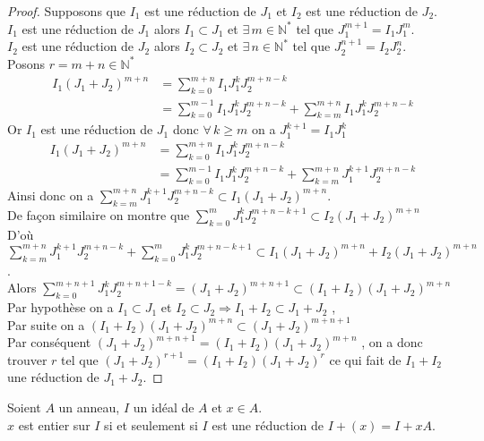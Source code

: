 \begin{proof}
	Supposons que $I_1$ est une réduction de $J_1$ et $I_2$ est une réduction de $J_2$.\\
	$I_1$ est une réduction de $J_1$ alors $I_1 \subset J_1$ et $\exists \, m \in \mathbb{N^*}$ tel que $J_1^{m+1} = I_1 J_1^m$.\\
	$I_2$ est une réduction de $J_2$ alors $I_2 \subset J_2$ et $\exists \, n \in \mathbb{N^*}$ tel que $J_2^{n+1} = I_2 J_2^n$.\\
	Posons $r=m+n \in \mathbb{N^*} $\\
	\begin{align*}
		I_1(J_1+J_2)^{m+n}& = \displaystyle \sum_{k=0}^{m+n}{I_1 J_1^k J_2^{m+n-k}}\\
		& = \displaystyle \sum_{k=0}^{m-1}{I_1 J_1^k J_2^{m+n-k}} + \displaystyle \sum_{k=m}^{m+n}{I_1 J_1^k J_2^{m+n-k}}
	\end{align*}
	Or $I_1$ est une réduction de $J_1$ donc $\forall \, k\geq m$ on a $J_1^{k+1} = I_1 J_1^{k}$
	\begin{align*}
		I_1(J_1+J_2)^{m+n}& = \displaystyle \sum_{k=0}^{m+n}{I_1 J_1^k J_2^{m+n-k}}\\
		& = \displaystyle \sum_{k=0}^{m-1}{I_1 J_1^k J_2^{m+n-k}} + \displaystyle \sum_{k=m}^{m+n}{J_1^{k+1} J_2^{m+n-k}}
	\end{align*}
	Ainsi donc on a $\displaystyle \sum_{k=m}^{m+n}{J_1^{k+1} J_2^{m+n-k}} \subset  I_1(J_1+J_2)^{m+n}$.\\
	De façon similaire on montre que $\displaystyle \sum_{k=0}^{m}{J_1^{k} J_2^{m+n-k+1}} \subset  I_2(J_1+J_2)^{m+n}$\\
	D'où $\displaystyle \sum_{k=m}^{m+n}{J_1^{k+1} J_2^{m+n-k}} + \displaystyle \sum_{k=0}^{m}{J_1^{k} J_2^{m+n-k+1}} \subset I_1(J_1+J_2)^{m+n} + I_2(J_1+J_2)^{m+n}$.\\ Alors $\displaystyle \sum_{k=0}^{m+n+1}{J_1^{k} J_2^{m+n+1-k}} = (J_1+J_2)^{m+n+1} \subset (I_1+I_2)(J_1+J_2)^{m+n}$\\
	Par hypothèse on a $I_1 \subset J_1$ et $I_2 \subset J_2 \Rightarrow I_1+I_2 \subset J_1+J_2$ ,\\
	Par suite on a $(I_1+I_2)(J_1+J_2)^{m+n} \subset (J_1+J_2)^{m+n+1}$\\ Par conséquent $(J_1+J_2)^{m+n+1} = (I_1+I_2)(J_1+J_2)^{m+n}$ , on a donc trouver $r$ tel que $(J_1+J_2)^{r+1} = (I_1+I_2)(J_1+J_2)^{r}$ ce qui fait de $I_1+I_2$  une réduction de $J_1+J_2$.
\end{proof}
\begin{maproposition}
	Soient $A$ un anneau, $I$ un idéal de $A$ et $x \in A$.\\
	$x$ est entier sur $I$ si et seulement si $I$ est une réduction de $I + (x) = I +xA $.
\end{maproposition}
